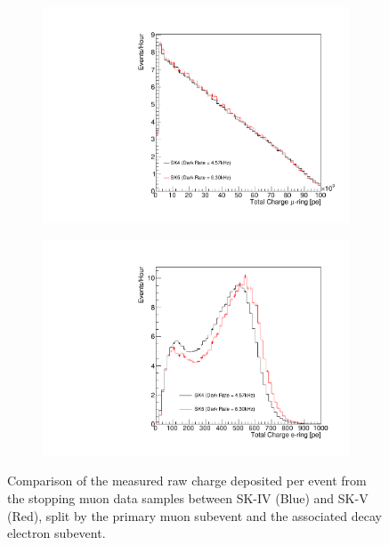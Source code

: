 \begin{figure}[h]
  \begin{subfigure}[t]{0.48\textwidth}
    \includegraphics[width=\textwidth, trim={0mm 0mm 0mm 0mm}, clip, page=1]{Figures/Simulations/ChargeAssociatedWithMuon.pdf}
  \end{subfigure}%
  \begin{subfigure}[t]{0.48\textwidth}
    \includegraphics[width=\textwidth, trim={0mm 0mm 0mm 0mm}, clip, page=1]{Figures/Simulations/ChargeAssociatedWithDecayE.pdf}
  \end{subfigure}  
  \caption{Comparison of the measured raw charge deposited per event from the stopping muon data samples between SK-IV (Blue) and SK-V (Red), split by the primary muon subevent and the associated decay electron subevent.}
  \label{fig:Simulations_MeasuredChargeDistribution}
\end{figure}

